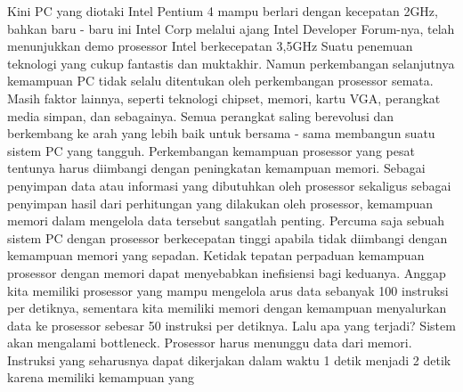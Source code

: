 Kini PC yang diotaki Intel Pentium 4 mampu berlari dengan kecepatan 2GHz, bahkan baru - baru ini Intel Corp melalui ajang Intel Developer Forum-nya, telah menunjukkan demo prosessor Intel berkecepatan 3,5GHz Suatu penemuan teknologi yang cukup fantastis dan muktakhir. Namun perkembangan selanjutnya kemampuan PC tidak selalu ditentukan oleh perkembangan prosessor semata.
Masih faktor lainnya, seperti teknologi chipset, memori, kartu VGA, perangkat media simpan, dan sebagainya. Semua perangkat saling berevolusi dan berkembang ke arah yang lebih baik untuk bersama - sama membangun suatu sistem PC yang tangguh. Perkembangan kemampuan prosessor yang pesat tentunya harus diimbangi dengan peningkatan kemampuan memori. Sebagai penyimpan data atau informasi yang dibutuhkan oleh prosessor sekaligus sebagai penyimpan hasil dari perhitungan yang dilakukan oleh prosessor, kemampuan memori dalam mengelola data tersebut sangatlah penting.
Percuma saja sebuah sistem PC dengan prosessor berkecepatan tinggi apabila tidak diimbangi dengan kemampuan memori yang sepadan. Ketidak tepatan perpaduan kemampuan prosessor dengan memori dapat menyebabkan inefisiensi bagi keduanya. Anggap kita memiliki prosessor yang mampu mengelola arus data sebanyak 100 instruksi per detiknya, sementara kita memiliki memori dengan kemampuan menyalurkan data ke prosessor sebesar 50 instruksi per detiknya. Lalu apa yang terjadi? Sistem akan mengalami bottleneck. Prosessor harus menunggu data dari memori.
Instruksi yang seharusnya dapat dikerjakan dalam waktu 1 detik menjadi 2 detik karena memiliki kemampuan yang